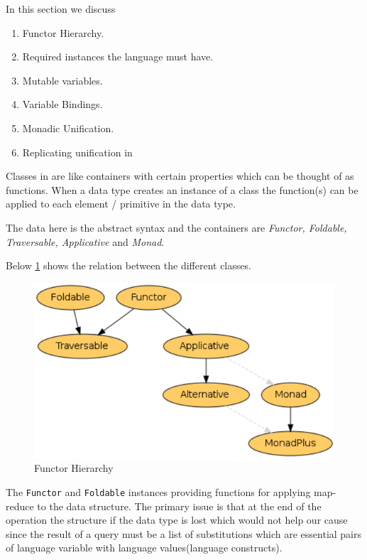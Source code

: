 \documentclass[thesis-solanki.tex]{subfiles}
\begin{document}
In this section we discuss
\begin{enumerate}
\item Functor Hierarchy.

\item Required instances the language must have.

\item Mutable variables.

\item Variable Bindings.
 
\item Monadic Unification.

\item Replicating  unification in  
\end{enumerate}

Classes in  are like containers with certain properties which can be thought of as functions. When a data type creates an
instance of a class the function(s) can be applied to each element / primitive in the data type.    


The data here is the  abstract syntax and the containers are \textit{Functor, Foldable, Traversable, Applicative} 
and \textit{Monad}.     

\clearpage

Below \ref{fig:Functor Hierarchy} shows the relation between the different classes.

\begin{figure}[th]
\centering
\includegraphics[scale = 0.7]{FunctorHierarchy.png}
\caption{Functor Hierarchy \cite{website:foldablenadtraversable}}
\label{fig:Functor Hierarchy}
\end{figure}  

The \Verb!Functor! and \Verb!Foldable! instances providing functions for applying map-reduce to the data structure. The primary issue is that at the end 
of the operation the structure if the data type is lost which would not help our cause since the result of a query must be a list of 
substitutions which are essential pairs of language variable with language values(language constructs). 
\end{document}
